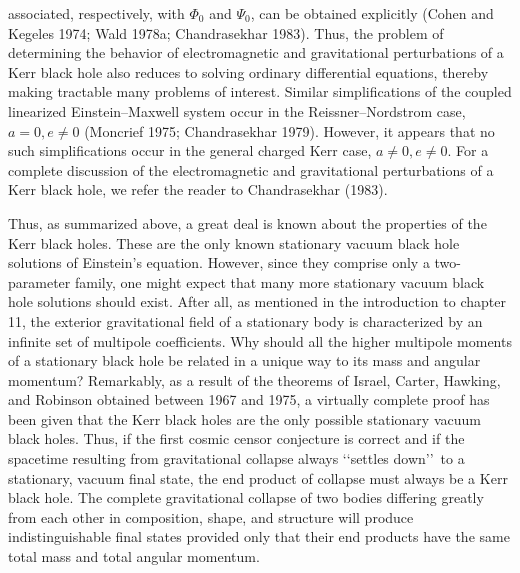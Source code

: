 associated, respectively, with \(\Phi_0\) and \(\Psi_0\), can be obtained explicitly
(Cohen and Kegeles 1974; Wald 1978a; Chandrasekhar 1983). Thus, the problem of
determining the behavior of electromagnetic and gravitational perturbations of a Kerr
black hole also reduces to solving ordinary differential equations, thereby making
tractable many problems of interest. Similar simplifications of the coupled linearized
Einstein--Maxwell system occur in the Reissner--Nordstrom case, \(a=0,e\ne0\)
(Moncrief 1975; Chandrasekhar 1979). However, it appears that no such
simplifications occur in the general charged Kerr case, \(a\ne0,e\ne0\). For a
complete discussion of the electromagnetic and gravitational perturbations of a Kerr
black hole, we refer the reader to Chandrasekhar (1983).

Thus, as summarized above, a great deal is known about the properties of the Kerr
black holes. These are the only known stationary vacuum black hole solutions of
Einstein's equation. However, since they comprise only a two-parameter family, one
might expect that many more stationary vacuum black hole solutions should exist.
After all, as mentioned in the introduction to chapter 11, the exterior gravitational
field of a stationary body is characterized by an infinite set of multipole coefficients.
Why should all the higher multipole moments of a stationary black hole be related in a
unique way to its mass and angular momentum? Remarkably, as a result of the
theorems of Israel, Carter, Hawking, and Robinson obtained between 1967 and 1975,
a virtually complete proof has been given that the Kerr black holes are the only
possible stationary vacuum black holes. Thus, if the first cosmic censor conjecture is
correct and if the spacetime resulting from gravitational collapse always
\lq\lq settles down\rq\rq\ to a stationary, vacuum final state, the end product of
collapse must always be a Kerr black hole. The complete gravitational collapse of two
bodies differing greatly from each other in composition, shape, and structure will
produce indistinguishable final states provided only that their end products have the
same total mass and total angular momentum.

